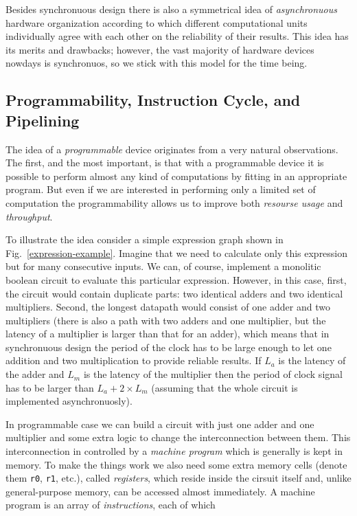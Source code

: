 Besides synchronuous design there is also a symmetrical idea of \emph{asynchronuous} hardware organization according to which
different computational units individually agree with each other on the reliability of their results. This idea has its
merits and drawbacks; however, the vast majority of hardware devices nowdays is synchronuos, so we stick with this model for
the time being.

\subsection{Programmability, Instruction Cycle, and Pipelining}

The idea of a \emph{programmable} device originates from a very natural observations. The first, and the most important, is
that with a programmable device it is possible to perform almost any kind of computations by fitting in an appropriate program.
But even if we are interested in performing only a limited set of computation the programmability allows us to improve
both \emph{resourse usage} and \emph{throughput}.

To illustrate the idea consider a simple expression graph shown in Fig.~\ref{expression-example}. Imagine that we 
need to calculate only this expression but for many consecutive inputs. We can, of course, implement a monolitic
boolean circuit to evaluate this particular expression. However, in this case, first, the circuit would contain
duplicate parts: two identical adders and two identical multipliers.
Second, the longest datapath would consist of one adder and two multipliers (there is also a path with two adders and
one multiplier, but the latency of a multiplier is larger than that for an adder),
which means   that in synchronuous design the period of the clock has to be large enough to let one addition and two multiplication to
provide reliable results. If $L_a$ is the latency of the adder and $L_m$ is the latency of the multiplier then the period of
clock signal has to be larger than $L_a + 2\times L_m$ (assuming that the whole circuit is implemented asynchronuosly).

In programmable case we can build a circuit with just one adder and one multiplier and some extra logic to
change the interconnection between them. This interconnection in controlled by a \emph{machine program} which is
generally is kept in memory. To make the things work we also need some extra memory cells (denote them \verb|r0|, \verb|r1|, etc.),
called \emph{registers}, which reside inside the cirsuit itself and, unlike general-purpose memory, can be accessed
almost immediately. A machine program is an array of \emph{instructions}, each of which 



